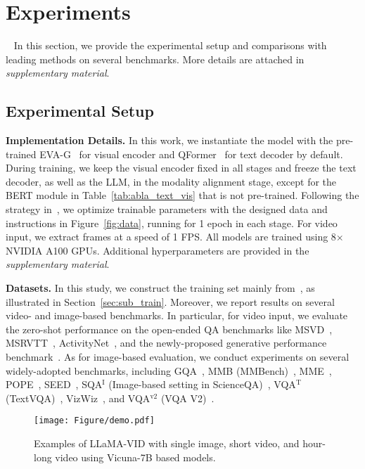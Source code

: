 \section{Experiments}~\label{sec:experiment}
In this section, we provide the experimental setup and comparisons with leading methods on several benchmarks.
More details are attached in {\em supplementary material}.

\subsection{Experimental Setup}
\noindent
\textbf{Implementation Details.}
In this work, we instantiate the model with the pre-trained EVA-G~\cite{evaclip} for visual encoder and QFormer~\cite{instructblip} for text decoder by default.
During training, we keep the visual encoder fixed in all stages and freeze the text decoder, as well as the LLM, in the modality alignment stage, except for the BERT module in Table~\ref{tab:abla_text_vis} that is not pre-trained.
Following the strategy in~\cite{llava1.5}, we optimize trainable parameters with the designed data and instructions in Figure~\ref{fig:data}, running for 1 epoch in each stage.
For video input, we extract frames at a speed of 1 FPS.
All models are trained using 8$\times$NVIDIA A100 GPUs.
Additional hyperparameters are provided in the {\em supplementary material}.

\vspace{1.0em}
\noindent
\textbf{Datasets.}
In this study, we construct the training set mainly from~\cite{llava1.5,webvid,videochatgpt,movienet}, as illustrated in Section~\ref{sec:sub_train}.
Moreover, we report results on several video- and image-based benchmarks.
In particular, for video input, we evaluate the zero-shot performance on the open-ended QA benchmarks like MSVD~\cite{msvd}, MSRVTT~\cite{msrvtt}, ActivityNet~\cite{activitynet}, and the newly-proposed generative performance benchmark~\cite{videochatgpt}.
As for image-based evaluation, we conduct experiments on several widely-adopted benchmarks, including GQA~\cite{gqa}, MMB (MMBench)~\cite{mmbench}, MME~\cite{mme}, POPE~\cite{pope}, SEED~\cite{seed}, SQA$^\text{I}$ (Image-based setting in ScienceQA)~\cite{scienceqa}, VQA$^\text{T}$ (TextVQA)~\cite{textvqa}, VizWiz~\cite{vizwiz}, and VQA$^\text{v2}$ (VQA V2)~\cite{vqav2}.

\begin{figure*}[t!]
\centering
\texttt{[image: Figure/demo.pdf]} 
\caption{
Examples of LLaMA-VID with single image, short video, and hour-long video using Vicuna-7B based models.
}
\label{fig:demo}
\end{figure*}

